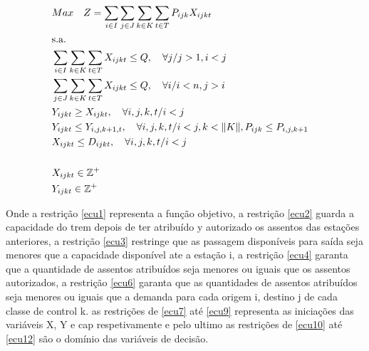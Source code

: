 \documentclass[10pt,a4paper]{article}
\begin{document}
\begin{align}
	 & Max \quad Z = \sum_{i\in I} \sum_{j\in J} \sum_{k\in K} \sum_{t\in T} P_{ijk} X_{ijkt}                                             \label{ecu1}  & \\
	 & \text{s.a.}  \notag                                                                                                                              & \\
	 & \sum_{i\in I}\sum_{k\in K}\sum_{t\in T}X_{ijkt} \leq Q , \quad \forall j / j>1, i<j                                                \label{ecu2}  & \\
	 & \sum_{j\in J}\sum_{k\in K}\sum_{t\in T}X_{ijkt} \leq Q , \quad \forall i / i<n, j>i                                                \label{ecu3}  & \\
	 & Y_{ijkt} \geq X_{ijkt},  \quad \forall i,j,k,t/ i < j                                                                              \label{ecu4}  & \\
	 & Y_{ijkt} \leq Y_{i,j,k+1,t},  \quad \forall i,j,k,t / i < j, k < \lVert K \rVert,  P_{ijk} \leq P_{i,j,k+1}                        \label{ecu5}  & \\
	 & X_{ijkt} \leq D_{ijkt},  \quad \forall i,j,k,t/ i < j                                                                              \label{ecu6}  & \\[15pt]
	 & X_{ijkt} \in \mathbb{Z}^+                                                                                                           \label{ecu10} & \\
	 & Y_{ijkt} \in \mathbb{Z}^+                                                                                                           \label{ecu11}
\end{align}

Onde a restrição \ref{ecu1} representa a função objetivo, a restrição \ref{ecu2} guarda a capacidade do trem depois
de ter atribuído y autorizado os assentos das estações anteriores, a restrição \ref{ecu3} restringe que as passagem disponíveis para
saída seja menores que a capacidade disponível ate a estação i, a restrição \ref{ecu4} garanta que a quantidade de assentos atribuídos
seja menores ou iguais que os assentos autorizados, a restrição \ref{ecu6} garanta que as quantidades de assentos atribuídos seja menores
ou iguais que a demanda para cada origem i, destino j de cada classe de control k. as restrições de \ref{ecu7} até \ref{ecu9} representa
as iniciações das variáveis X, Y e cap respetivamente e pelo ultimo as restrições de \ref{ecu10} até \ref{ecu12} são o domínio das variáveis de decisão.
\\ \\
\end{document}
